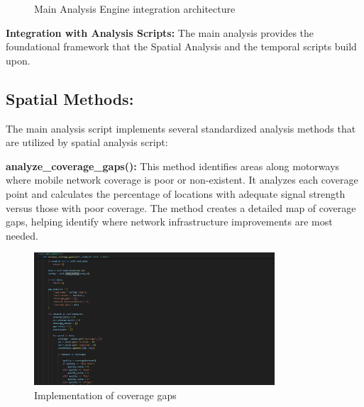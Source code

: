\documentclass[MScCS]{uccthesis}
\begin{document}
\begin{figure}[h]
\centering
{}
\caption{Main Analysis Engine integration architecture}
\label{fig:main_analysis_architecture}
\end{figure}

\textbf{Integration with Analysis Scripts:}
The main analysis provides the foundational framework that the Spatial Analysis and the temporal scripts build upon.




\subsection{Spatial Methods:}
The main analysis script implements several standardized analysis methods that are utilized by spatial analysis script:

\textbf{analyze\_coverage\_gaps():}
This method identifies areas along motorways where mobile network coverage is poor or non-existent. It analyzes each coverage point and calculates the percentage of locations with adequate signal strength versus those with poor coverage. The method creates a detailed map of coverage gaps, helping identify where network infrastructure improvements are most needed.

\begin{figure}[H]
   \centering
   \includegraphics[width=0.8\textwidth]{Images/analyze_coverage_gap.png}
   \caption{Implementation of coverage gaps}
   \label{fig:spatial_coverage_gap}
   \end{figure}
\end{document}

